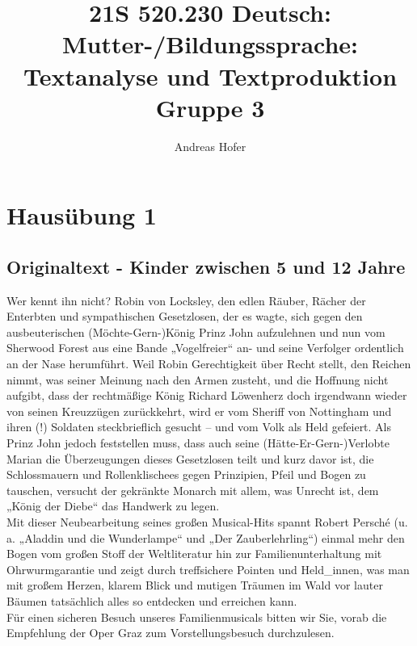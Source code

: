 \documentclass{article}
\title{21S 520.230 Deutsch: Mutter-/Bildungssprache: Textanalyse und Textproduktion Gruppe 3}
\author{Andreas Hofer}
\begin{document}
\section*{Hausübung 1}
\subsection*{Originaltext - Kinder zwischen 5 und 12 Jahre}
Wer kennt ihn nicht? Robin von Locksley, den edlen Räuber, Rächer der Enterbten und sympathischen Gesetzlosen, der es wagte, sich gegen den ausbeuterischen (Möchte-Gern-)König Prinz John aufzulehnen und nun vom Sherwood Forest aus eine Bande „Vogelfreier“ an- und seine Verfolger ordentlich an der Nase herumführt. Weil Robin Gerechtigkeit über Recht stellt, den Reichen nimmt, was seiner Meinung nach den Armen zusteht, und die Hoffnung nicht aufgibt, dass der rechtmäßige König Richard Löwenherz doch irgendwann wieder von seinen Kreuzzügen zurückkehrt, wird er vom Sheriff von Nottingham und ihren (!) Soldaten steckbrieflich gesucht – und vom Volk als Held gefeiert. Als Prinz John jedoch feststellen muss, dass auch seine (Hätte-Er-Gern-)Verlobte Marian die Überzeugungen dieses Gesetzlosen teilt und kurz davor ist, die Schlossmauern und Rollenklischees gegen Prinzipien, Pfeil und Bogen zu tauschen, versucht der gekränkte Monarch mit allem, was Unrecht ist, dem „König der Diebe“ das Handwerk zu legen.\\

Mit dieser Neubearbeitung seines großen Musical-Hits spannt Robert Persché (u. a. „Aladdin und die Wunderlampe“ und „Der Zauberlehrling“) einmal mehr den Bogen vom großen Stoff der Weltliteratur hin zur Familienunterhaltung mit Ohrwurmgarantie und zeigt durch treffsichere Pointen und Held\_innen, was man mit großem Herzen, klarem Blick und mutigen Träumen im Wald vor lauter Bäumen tatsächlich alles so entdecken und erreichen kann.\\

Für einen sicheren Besuch unseres Familienmusicals bitten wir Sie, vorab die Empfehlung der Oper Graz zum Vorstellungsbesuch durchzulesen.
\end{document}
